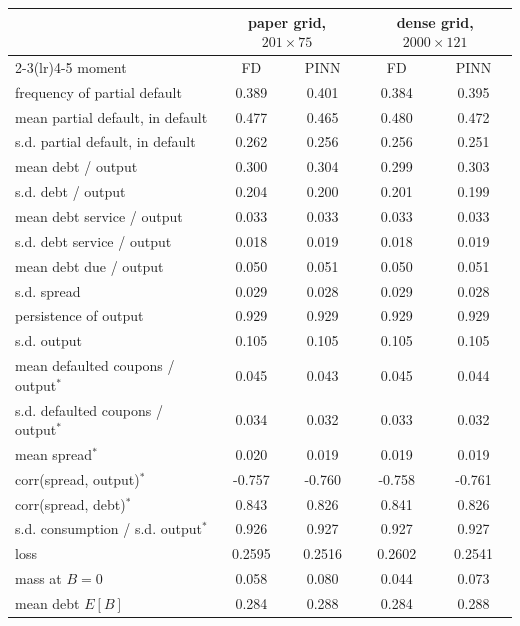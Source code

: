 \begin{tabular}{lcccc}
\toprule
 & \multicolumn{2}{c}{paper grid, $201\times 75$} & \multicolumn{2}{c}{dense grid, $2000\times 121$} \\
\cmidrule(lr){2-3}\cmidrule(lr){4-5}
moment & FD & PINN & FD & PINN \\
\midrule
frequency of partial default & 0.389 & 0.401 & 0.384 & 0.395 \\
mean partial default, in default & 0.477 & 0.465 & 0.480 & 0.472 \\
s.d. partial default, in default & 0.262 & 0.256 & 0.256 & 0.251 \\
mean debt / output & 0.300 & 0.304 & 0.299 & 0.303 \\
s.d. debt / output & 0.204 & 0.200 & 0.201 & 0.199 \\
mean debt service / output & 0.033 & 0.033 & 0.033 & 0.033 \\
s.d. debt service / output & 0.018 & 0.019 & 0.018 & 0.019 \\
mean debt due / output & 0.050 & 0.051 & 0.050 & 0.051 \\
s.d. spread & 0.029 & 0.028 & 0.029 & 0.028 \\
persistence of output & 0.929 & 0.929 & 0.929 & 0.929 \\
s.d. output & 0.105 & 0.105 & 0.105 & 0.105 \\
mean defaulted coupons / output$^*$ & 0.045 & 0.043 & 0.045 & 0.044 \\
s.d. defaulted coupons / output$^*$ & 0.034 & 0.032 & 0.033 & 0.032 \\
mean spread$^*$ & 0.020 & 0.019 & 0.019 & 0.019 \\
corr(spread, output)$^*$ & -0.757 & -0.760 & -0.758 & -0.761 \\
corr(spread, debt)$^*$ & 0.843 & 0.826 & 0.841 & 0.826 \\
s.d. consumption / s.d. output$^*$ & 0.926 & 0.927 & 0.927 & 0.927 \\
\midrule
loss & 0.2595 & 0.2516 & 0.2602 & 0.2541 \\
mass at $B=0$ & 0.058 & 0.080 & 0.044 & 0.073 \\
mean debt $E[B]$ & 0.284 & 0.288 & 0.284 & 0.288 \\
\bottomrule
\end{tabular}
